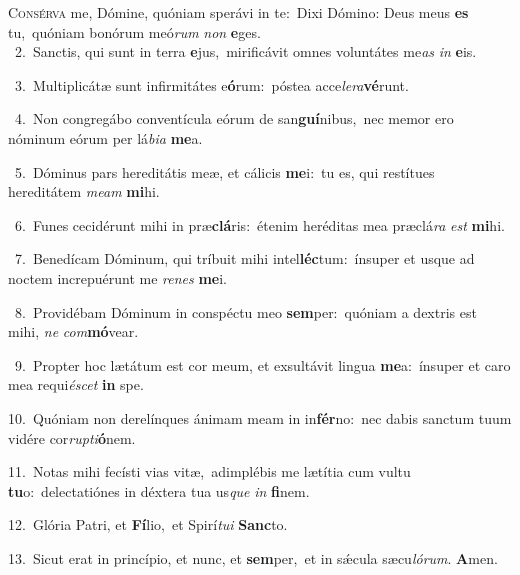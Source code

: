 \lettrine{\initial\textcolor{\initialcolor}{C}}{onsérva} me, Dómine, quóniam sperávi in te:~\dagger Dixi Dómino: Deus meus \textbf{es} tu,~\star quóniam bonórum meó\textit{rum} \textit{non} \textbf{e}\-ges.\\
{\numbfont\textcolor{\numbcolor}{~2.}}~Sanctis, qui sunt in terra \textbf{e}\-jus,~\star mirificávit omnes voluntátes me\textit{as} \textit{in} \textbf{e}\-is.\par
{\numbfont\textcolor{\numbcolor}{~3.}}~Multiplicátæ sunt infirmitátes e\-\textbf{ó}\-rum:~\star póstea acce\-\textit{le}\-\textit{ra}\textbf{vé}runt.\par
{\numbfont\textcolor{\numbcolor}{~4.}}~Non congregábo conventícula eórum de san\-\textbf{guí}\-nibus,~\star nec memor ero nóminum eórum per lá\-\textit{bi}\-\textit{a} \textbf{me}\-a.\par
{\numbfont\textcolor{\numbcolor}{~5.}}~Dóminus pars hereditátis meæ, et cálicis \textbf{me}\-i:~\star tu es, qui restítues hereditátem \textit{me}\-\textit{am} \textbf{mi}\-hi.\par
{\numbfont\textcolor{\numbcolor}{~6.}}~Funes cecidérunt mihi in præ\-\textbf{clá}\-ris:~\star étenim heréditas mea præclá\textit{ra} \textit{est} \textbf{mi}\-hi.\par
{\numbfont\textcolor{\numbcolor}{~7.}}~Benedícam Dóminum, qui tríbuit mihi intel\-\textbf{léc}\-tum:~\star ínsuper et usque ad noctem increpuérunt me \textit{re}\-\textit{nes} \textbf{me}\-i.\par
{\numbfont\textcolor{\numbcolor}{~8.}}~Providébam Dóminum in conspéctu meo \textbf{sem}\-per:~\star quóniam a dextris est mihi, \textit{ne} \textit{com}\-\textbf{mó}vear.\par
{\numbfont\textcolor{\numbcolor}{~9.}}~Propter hoc lætátum est cor meum, et exsultávit lingua \textbf{me}\-a:~\star ínsuper et caro mea requi\-\textit{é}\-\textit{scet} \textbf{in} spe.\par
{\numbfont\textcolor{\numbcolor}{10.}}~Quóniam non derelínques ánimam meam in in\-\textbf{fér}\-no:~\star nec dabis sanctum tuum vidére cor\-\textit{rup}\-\textit{ti}\textbf{ó}nem.\par
{\numbfont\textcolor{\numbcolor}{11.}}~Notas mihi fecísti vias vitæ,~\dagger adimplébis me lætítia cum vultu \textbf{tu}\-o:~\star delectatiónes in déxtera tua us\textit{que} \textit{in} \textbf{fi}\-nem.\par
{\numbfont\textcolor{\numbcolor}{12.}}~Glória Patri, et \textbf{Fí}\-lio,~\star et Spirí\-\textit{tu}\-\textit{i} \textbf{Sanc}\-to.\par
{\numbfont\textcolor{\numbcolor}{13.}}~Sicut erat in princípio, et nunc, et \textbf{sem}\-per,~\star et in sǽcula sæcu\-\textit{ló}\-\textit{rum}. \textbf{A}\-men.\par
